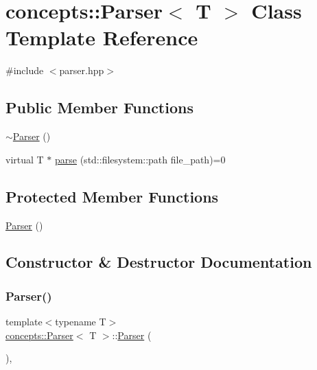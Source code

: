 \hypertarget{classconcepts_1_1_parser}{}\section{concepts\+:\+:Parser$<$ T $>$ Class Template Reference}
\label{classconcepts_1_1_parser}


{\ttfamily \#include $<$parser.\+hpp$>$}

\subsection*{Public Member Functions}
\begin{DoxyCompactItemize}
\item 
\hyperlink{classconcepts_1_1_parser_ab80c529e217209d73ee57a1caf166710}{$\sim$\+Parser} ()
\item 
virtual T $\ast$ \hyperlink{classconcepts_1_1_parser_ac5e6fbf08f6d462695c946647aafb2ce}{parse} (std\+::filesystem\+::path file\+\_\+path)=0
\end{DoxyCompactItemize}
\subsection*{Protected Member Functions}
\begin{DoxyCompactItemize}
\item 
\hyperlink{classconcepts_1_1_parser_a649e088ec83277c61704ed90c4c9f59e}{Parser} ()
\end{DoxyCompactItemize}


\subsection{Constructor \& Destructor Documentation}
\mbox{\label{classconcepts_1_1_parser_a649e088ec83277c61704ed90c4c9f59e}} 
\subsubsection{\texorpdfstring{Parser()}{Parser()}}
{\footnotesize\ttfamily template$<$typename T$>$ \\
\hyperlink{classconcepts_1_1_parser}{concepts\+::\+Parser}$<$ T $>$\+::\hyperlink{classconcepts_1_1_parser}{Parser} (\begin{DoxyParamCaption}{ }\end{DoxyParamCaption})\hspace{0.3cm}{\ttfamily [inline]}, {\ttfamily [protected]}}

